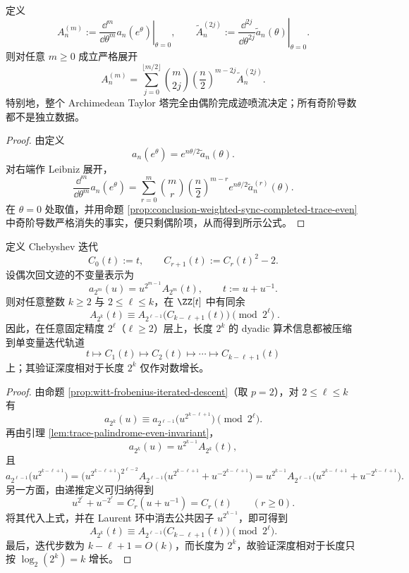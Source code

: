 \begin{theorem}\label{thm:conclusion-weighted-sync-archimedean-jet-binary-compression}
定义
\[
A_n^{(m)}:=\left.\frac{\dd^m}{\dd\theta^m}a_n(e^\theta)\right|_{\theta=0},
\qquad
\widetilde A_n^{(2j)}:=\left.\frac{\dd^{2j}}{\dd\theta^{2j}}\widetilde a_n(\theta)\right|_{\theta=0}.
\]
则对任意 \(m\ge 0\) 成立严格展开
\[
A_n^{(m)}
=
\sum_{j=0}^{\lfloor m/2\rfloor}
\binom{m}{2j}
\left(\frac n2\right)^{m-2j}
\widetilde A_n^{(2j)}.
\]
特别地，整个 Archimedean Taylor 塔完全由偶阶完成迹喷流决定；所有奇阶导数都不是独立数据。
\end{theorem}

\begin{proof}
由定义
\[
a_n(e^\theta)=e^{n\theta/2}\widetilde a_n(\theta).
\]
对右端作 Leibniz 展开，
\[
\frac{\dd^m}{\dd\theta^m}a_n(e^\theta)
=
\sum_{r=0}^{m}\binom{m}{r}
\left(\frac n2\right)^{m-r}
e^{n\theta/2}\widetilde a_n^{(r)}(\theta).
\]
在 \(\theta=0\) 处取值，并用命题 \ref{prop:conclusion-weighted-sync-completed-trace-even} 中奇阶导数严格消失的事实，便只剩偶阶项，从而得到所示公式。
\end{proof}

\begin{theorem}\label{thm:conclusion-weighted-sync-dyadic-chebyshev-dwork-finite-precision}
定义 Chebyshev 迭代
\[
C_0(t):=t,
\qquad
C_{r+1}(t):=C_r(t)^2-2.
\]
设偶次回文迹的不变量表示为
\[
a_{2^m}(u)=u^{2^{m-1}}A_{2^m}(t),
\qquad
t:=u+u^{-1}.
\]
则对任意整数 \(k\ge 2\) 与 \(2\le \ell\le k\)，在 \(\ZZ[t]\) 中有同余
\[
\boxed{\;
A_{2^k}(t)\equiv A_{2^{\ell-1}}\!\bigl(C_{k-\ell+1}(t)\bigr)\pmod{2^\ell}\; }.
\]
因此，在任意固定精度 \(2^\ell\)（\(\ell\ge 2\)）层上，长度 \(2^k\) 的 dyadic 算术信息都被压缩到单变量迭代轨道
\[
t\mapsto C_1(t)\mapsto C_2(t)\mapsto \cdots \mapsto C_{k-\ell+1}(t)
\]
上；其验证深度相对于长度 \(2^k\) 仅作对数增长。
\end{theorem}

\begin{proof}
由命题 \ref{prop:witt-frobenius-iterated-descent}（取 \(p=2\)），对 \(2\le \ell\le k\) 有
\[
a_{2^k}(u)\equiv a_{2^{\ell-1}}\!\bigl(u^{2^{k-\ell+1}}\bigr)\pmod{2^\ell}.
\]
再由引理 \ref{lem:trace-palindrome-even-invariant}，
\[
a_{2^k}(u)=u^{2^{k-1}}A_{2^k}(t),
\]
且
\[
a_{2^{\ell-1}}\!\bigl(u^{2^{k-\ell+1}}\bigr)
=
\bigl(u^{2^{k-\ell+1}}\bigr)^{2^{\ell-2}}
A_{2^{\ell-1}}\!\bigl(u^{2^{k-\ell+1}}+u^{-2^{k-\ell+1}}\bigr)
=
u^{2^{k-1}}A_{2^{\ell-1}}\!\bigl(u^{2^{k-\ell+1}}+u^{-2^{k-\ell+1}}\bigr).
\]
另一方面，由递推定义可归纳得到
\[
u^{2^r}+u^{-2^r}=C_r(u+u^{-1})=C_r(t)\qquad(r\ge 0).
\]
将其代入上式，并在 Laurent 环中消去公共因子 \(u^{2^{k-1}}\)，即可得到
\[
A_{2^k}(t)\equiv A_{2^{\ell-1}}\!\bigl(C_{k-\ell+1}(t)\bigr)\pmod{2^\ell}.
\]
最后，迭代步数为 \(k-\ell+1=O(k)\)，而长度为 \(2^k\)，故验证深度相对于长度只按 \(\log_2(2^k)=k\) 增长。
\end{proof}

